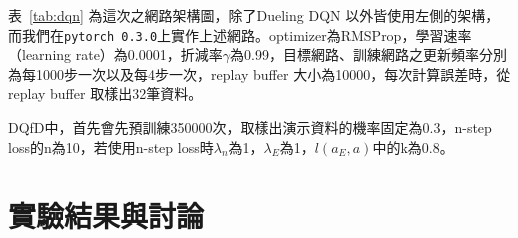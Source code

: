 \documentclass{article}
\begin{document}
表~\ref{tab:dqn} 為這次之網路架構圖，除了Dueling DQN 以外皆使用左側的架構，而我們在\texttt{pytorch 0.3.0}上實作上述網路。optimizer為RMSProp，學習速率（learning rate）為0.0001，折減率$\gamma$為0.99，目標網路、訓練網路之更新頻率分別為每1000步一次以及每4步一次，replay buffer 大小為10000，每次計算誤差時，從replay buffer 取樣出32筆資料。\par
DQfD中，首先會先預訓練350000次，取樣出演示資料的機率固定為0.3，n-step loss的n為10，若使用n-step loss時$\lambda_n$為1，$\lambda_E$為1，$l(a_E,a)$中的k為0.8。

\section{實驗結果與討論}



\renewcommand\refname{參考文獻}


\end{document}

